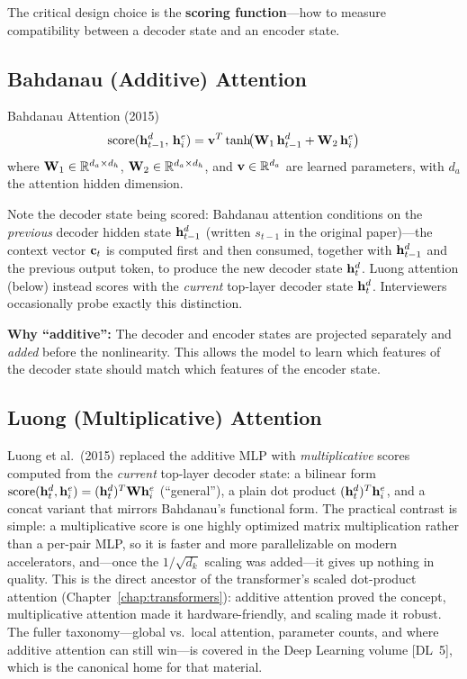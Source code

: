 The critical design choice is the \textbf{scoring function}---how to
measure compatibility between a decoder state and an encoder state.

\subsection{Bahdanau (Additive) Attention}

\begin{mathresult}{Bahdanau Attention (2015)}
\begin{equation}
\text{score}(\mathbf{h}_{t-1}^d,\, \mathbf{h}_i^e)
= \mathbf{v}^T \tanh\!\bigl(\mathbf{W}_1 \,\mathbf{h}_{t-1}^d + \mathbf{W}_2 \,\mathbf{h}_i^e\bigr)
\label{eq:bahdanau}
\end{equation}
where $\mathbf{W}_1 \in \mathbb{R}^{d_a \times d_h}$, $\mathbf{W}_2 \in \mathbb{R}^{d_a \times d_h}$,
and $\mathbf{v} \in \mathbb{R}^{d_a}$ are learned parameters, with $d_a$ the
attention hidden dimension.
\end{mathresult}

Note the decoder state being scored: Bahdanau attention conditions on the
\emph{previous} decoder hidden state $\mathbf{h}_{t-1}^d$ (written $s_{t-1}$ in
the original paper)---the context vector $\mathbf{c}_t$ is computed first and
then consumed, together with $\mathbf{h}_{t-1}^d$ and the previous output token,
to produce the new decoder state $\mathbf{h}_t^d$.  Luong attention (below)
instead scores with the \emph{current} top-layer decoder state
$\mathbf{h}_t^d$.  Interviewers occasionally probe exactly this distinction.

\textbf{Why ``additive'':}  The decoder and encoder states are projected
separately and \emph{added} before the nonlinearity.  This allows the
model to learn which features of the decoder state should match which
features of the encoder state.

\subsection{Luong (Multiplicative) Attention}

Luong et al.\ (2015) replaced the additive MLP with \emph{multiplicative}
scores computed from the \emph{current} top-layer decoder state: a bilinear
form $\text{score}(\mathbf{h}_t^d, \mathbf{h}_i^e) = (\mathbf{h}_t^d)^T \mathbf{W} \mathbf{h}_i^e$
(``general''), a plain dot product $(\mathbf{h}_t^d)^T \mathbf{h}_i^e$, and a concat
variant that mirrors Bahdanau's functional form.  The practical contrast is
simple: a multiplicative score is one highly optimized matrix
multiplication rather than a per-pair MLP, so it is faster and more
parallelizable on modern accelerators, and---once the $1/\sqrt{d_k}$
scaling was added---it gives up nothing in quality.  This is the direct
ancestor of the transformer's scaled dot-product attention
(Chapter~\ref{chap:transformers}): additive attention proved the concept,
multiplicative attention made it hardware-friendly, and scaling made it
robust.  The fuller taxonomy---global vs.\ local attention, parameter
counts, and where additive attention can still win---is covered in the Deep
Learning volume [DL~5], which is the canonical home for that material.

